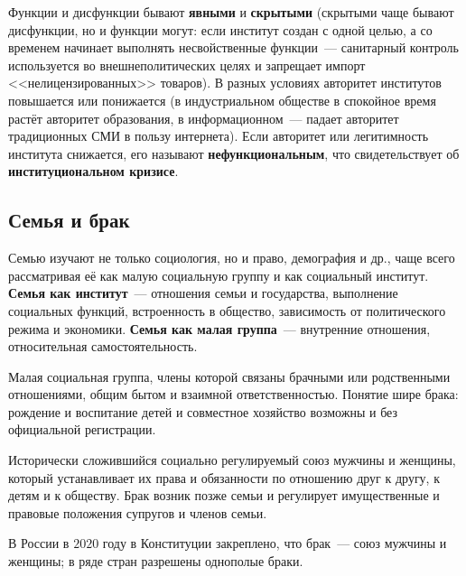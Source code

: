 \documentclass[12pt]{article}
\begin{document}
	\begin{note}
		Функции и дисфункции бывают \textbf{явными} и \textbf{скрытыми} (скрытыми чаще бывают дисфункции, но и функции могут: если институт создан с одной целью, а со временем начинает выполнять несвойственные функции~--- санитарный контроль используется во внешнеполитических целях и запрещает импорт <<нелицензированных>> товаров). В разных условиях авторитет институтов повышается или понижается (в индустриальном обществе в спокойное время растёт авторитет образования, в информационном~--- падает авторитет традиционных СМИ в пользу интернета). Если авторитет или легитимность института снижается, его называют \textbf{нефункциональным}, что свидетельствует об \textbf{институциональном кризисе}.
	\end{note}

	\subsection{Семья и брак}

	\begin{note}
		Семью изучают не только социология, но и право, демография и др., чаще всего рассматривая её как малую социальную группу и как социальный институт. \textbf{Семья как институт}~--- отношения семьи и государства, выполнение социальных функций, встроенность в общество, зависимость от политического режима и экономики. \textbf{Семья как малая группа}~--- внутренние отношения, относительная самостоятельность.
	\end{note}

	\begin{definition}[Семья]
		Малая социальная группа, члены которой связаны брачными или родственными отношениями, общим бытом и взаимной ответственностью. Понятие шире брака: рождение и воспитание детей и совместное хозяйство возможны и без официальной регистрации.
	\end{definition}

	\begin{definition}[Брак]
		Исторически сложившийся социально регулируемый союз мужчины и женщины, который устанавливает их права и обязанности по отношению друг к другу, к детям и к обществу. Брак возник позже семьи и регулирует имущественные и правовые положения супругов и членов семьи.
	\end{definition}

	\begin{note}
		В России в $2020$ году в Конституции закреплено, что брак~--- союз мужчины и женщины; в ряде стран разрешены однополые браки.
	\end{note}
\end{document}
